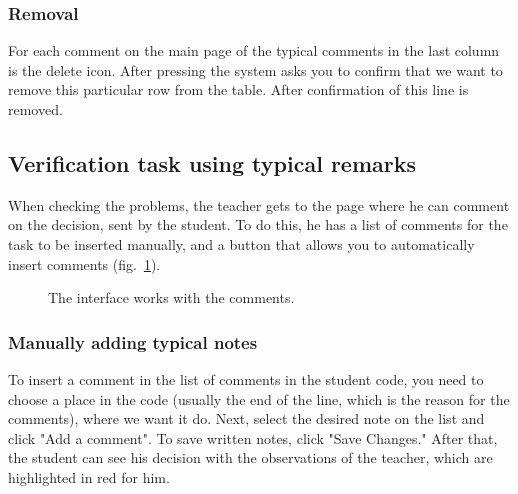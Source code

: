 \documentclass{acmtog} %
\begin{document}
\subsubsection*{Removal}
For each comment on the main page of the typical comments in the last column is the delete icon. After pressing the system asks you to confirm that we want to remove this particular row from the table. After confirmation of this line is removed.

\subsection{Verification task using typical remarks}
When checking the problems, the teacher gets to the page where he can comment on the decision, sent by the student. To do this, he has a list of comments for the task to be inserted manually, and a button that allows you to automatically insert comments (fig.~\ref{autoremark}).
\begin{figure}[h]
\caption{The interface works with the comments.}
\label{autoremark}
\end{figure}

\subsubsection*{Manually adding typical notes}
To insert a comment in the list of comments in the student code, you need to choose a place in the code (usually the end of the line, which is the reason for the comments), where we want it
do. Next, select the desired note on the list and click "Add a comment". To save written notes, click "Save Changes." After that, the student can see his decision with the observations of the teacher, which are highlighted in red for him.
\end{document}
